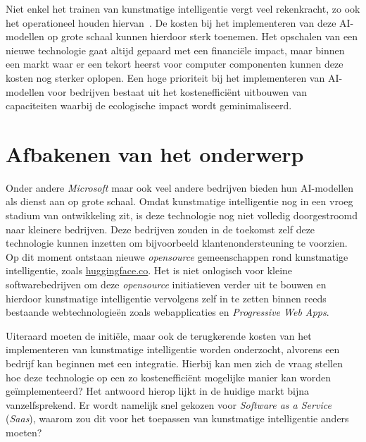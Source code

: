 \bigbreak{}

Niet enkel het trainen van kunstmatige intelligentie vergt veel rekenkracht, zo ook het operationeel houden hiervan~\autocite{Patel2023}. De kosten bij het implementeren van deze AI-modellen op grote schaal kunnen hierdoor sterk toenemen. Het opschalen van een nieuwe technologie gaat altijd gepaard met een financiële impact, maar binnen een markt waar er een tekort heerst voor computer componenten  kunnen deze kosten nog sterker oplopen. Een hoge prioriteit bij het implementeren van AI-modellen voor bedrijven bestaat uit het kostenefficiënt uitbouwen van capaciteiten waarbij de ecologische impact wordt geminimaliseerd.

\bigbreak{}

\section{Afbakenen van het onderwerp}

Onder andere \textit{Microsoft} maar ook veel andere bedrijven bieden hun AI-modellen als dienst aan op grote schaal. Omdat kunstmatige intelligentie nog in een vroeg stadium van ontwikkeling zit, is deze technologie nog niet volledig doorgestroomd naar kleinere bedrijven. Deze bedrijven zouden in de toekomst zelf deze technologie kunnen inzetten om bijvoorbeeld klan\-ten\-on\-der\-steu\-ning te voorzien. Op dit moment ontstaan nieuwe \textit{opensource} gemeenschappen rond kunstmatige intelligentie, zoals \href{https://huggingface.co/}{huggingface.co}. Het is niet onlogisch voor kleine softwarebedrijven om deze \textit{opensource} initiatieven verder uit te bouwen en hierdoor kunstmatige intelligentie vervolgens zelf in te zetten binnen reeds bestaande webtechnologieën zoals web\-app\-li\-ca\-ties en \textit{Progressive Web Apps}.

\bigbreak{}

Uiteraard moeten de initiële, maar ook de terugkerende kosten van het implementeren van kunstmatige intelligentie worden onderzocht, alvorens een bedrijf kan beginnen met een integratie. Hierbij kan men zich de vraag stellen hoe deze technologie op een zo kostenefficiënt mogelijke manier kan worden geïmplementeerd? Het antwoord hierop lijkt in de huidige markt bijna vanzelfsprekend. Er wordt namelijk snel gekozen voor \textit{Software as a Service} (\textit{Saas}), waarom zou dit voor het toepassen van kunstmatige intelligentie anders moeten?

\section{}%
\label{sec:probleemstelling}

